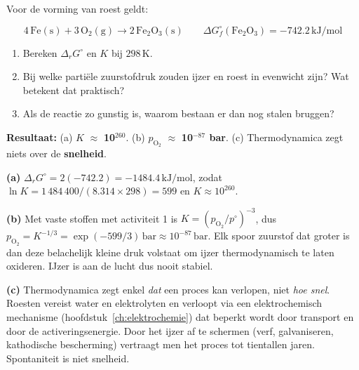 \begin{oefening}
Voor de vorming van roest geldt:

\[
\mathrm{4\,Fe(s) + 3\,O_2(g) \rightarrow 2\,Fe_2O_3(s)} \qquad \Delta G_f^\circ(\mathrm{Fe_2O_3}) = -742.2\,\mathrm{kJ/mol}
\]

\begin{enumerate}
\item[(a)]
  Bereken \(\Delta_r G^\circ\) en \(K\) bij \(298\,\mathrm{K}\).
\item[(b)]
  Bij welke partiële zuurstofdruk zouden ijzer en roest in evenwicht zijn? Wat betekent dat praktisch?
\item[(c)]
  Als de reactie zo gunstig is, waarom bestaan er dan nog stalen bruggen?
\end{enumerate}
\end{oefening}
\begin{oplossing}
\textbf{Resultaat:} (a) \(K\) \ensuremath{\approx{}} \textbf{10\ensuremath{^{260}}}. (b) \(p_{\mathrm{O_2}}\) \ensuremath{\approx{}} \textbf{10\ensuremath{^{-87}} bar}. (c) Thermodynamica zegt niets over de \textbf{snelheid}.

\textbf{(a)} \(\Delta_r G^\circ = 2(-742.2) = -1484.4\,\mathrm{kJ/mol}\), zodat \(\ln K = 1\,484\,400/(8.314 \times 298) = 599\) en \(K \approx 10^{260}\).

\textbf{(b)} Met vaste stoffen met activiteit 1 is \(K = (p_{\mathrm{O_2}}/p^\circ)^{-3}\), dus \(p_{\mathrm{O_2}} = K^{-1/3} = \exp(-599/3)\,\mathrm{bar} \approx 10^{-87}\,\mathrm{bar}\). Elk spoor zuurstof dat groter is dan deze belachelijk kleine druk volstaat om ijzer thermodynamisch te laten oxideren. IJzer is aan de lucht dus nooit stabiel.

\textbf{(c)} Thermodynamica zegt enkel \emph{dat} een proces kan verlopen, niet \emph{hoe snel}. Roesten vereist water en elektrolyten en verloopt via een elektrochemisch mechanisme (hoofdstuk~\ref{ch:elektrochemie}) dat beperkt wordt door transport en door de activeringsenergie. Door het ijzer af te schermen (verf, galvaniseren, kathodische bescherming) vertraagt men het proces tot tientallen jaren. Spontaniteit is niet snelheid.
\end{oplossing}

